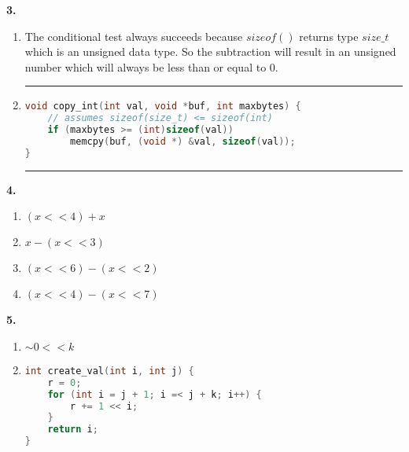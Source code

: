 \documentclass[11pt]{article} %
\newcommand{\hr}{\noindent\rule{14cm}{0.4pt}}
\begin{document}
\pagebreak
{\bf 3.}
\begin{enumerate}[label=\alph*)]
\item
The conditional test always succeeds because $sizeof()$ returns type $size\_t$ which is an unsigned data type. So the subtraction will result in an unsigned number which will always be less than or equal to $0$.
\item
\hr
\begin{lstlisting}[language=C]
void copy_int(int val, void *buf, int maxbytes) {
	// assumes sizeof(size_t) <= sizeof(int)
	if (maxbytes >= (int)sizeof(val)) 
		memcpy(buf, (void *) &val, sizeof(val));
}
\end{lstlisting}
\hr


\end{enumerate}


{\bf 4.}

\begin{enumerate}[label=\alph*)]
\item $(x << 4) + x$
\item $x - (x << 3)$
\item $(x << 6) - (x << 2)$
\item $(x << 4) - (x << 7)$
\end{enumerate}


\vspace{0.5in}
{\bf 5.}

\begin{enumerate}[label=\alph*)]

\item
$ \sim 0 << k$

\item
\begin{lstlisting}[language=C]
int create_val(int i, int j) {
	r = 0;
	for (int i = j + 1; i =< j + k; i++) {
		r += 1 << i;
	}
	return i;
}
\end{lstlisting}
\end{enumerate}
\end{document}
